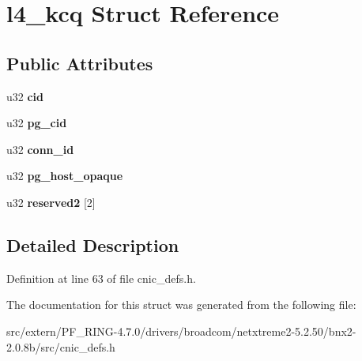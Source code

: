 \hypertarget{structl4__kcq}{
\section{l4\_\-kcq Struct Reference}
\label{structl4__kcq}
}
\subsection*{Public Attributes}
\begin{DoxyCompactItemize}
\item 
\hypertarget{structl4__kcq_a4aaf7bd1a49f6536fad7c13eb377fd20}{
u32 {\bfseries cid}}
\label{structl4__kcq_a4aaf7bd1a49f6536fad7c13eb377fd20}

\item 
\hypertarget{structl4__kcq_a4f863419cc630ff107660a343d9f9199}{
u32 {\bfseries pg\_\-cid}}
\label{structl4__kcq_a4f863419cc630ff107660a343d9f9199}

\item 
\hypertarget{structl4__kcq_a5c9e4b81c96c72b2eca067f1cc6154a4}{
u32 {\bfseries conn\_\-id}}
\label{structl4__kcq_a5c9e4b81c96c72b2eca067f1cc6154a4}

\item 
\hypertarget{structl4__kcq_aca7114991a052ab74edea60cae888661}{
u32 {\bfseries pg\_\-host\_\-opaque}}
\label{structl4__kcq_aca7114991a052ab74edea60cae888661}

\item 
\hypertarget{structl4__kcq_a747ef7633d7c8287f3daab6405f45ca3}{
u32 {\bfseries reserved2} \mbox{[}2\mbox{]}}
\label{structl4__kcq_a747ef7633d7c8287f3daab6405f45ca3}

\end{DoxyCompactItemize}


\subsection{Detailed Description}


Definition at line 63 of file cnic\_\-defs.h.



The documentation for this struct was generated from the following file:\begin{DoxyCompactItemize}
\item 
src/extern/PF\_\-RING-\/4.7.0/drivers/broadcom/netxtreme2-\/5.2.50/bnx2-\/2.0.8b/src/cnic\_\-defs.h\end{DoxyCompactItemize}
